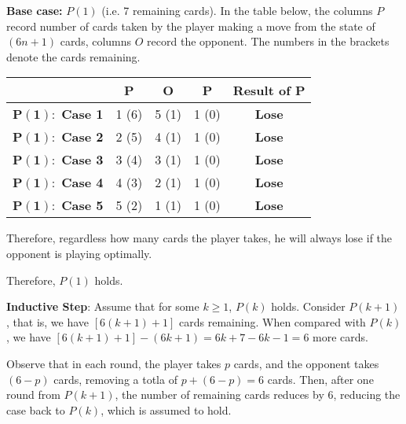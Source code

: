 \documentclass[answers]{exam}
\begin{document}
\begin{questions}
\begin{parts}
\begin{solution}
\begin{psol}
                \textbf{Base case:} $P(1)$ (i.e. 7 remaining cards).
                In the table below, the columns $P$ record number of cards taken by the player
                making a move from the state of $(6n+1)$ cards, columns $O$ record the opponent.
                The numbers in the brackets denote the cards remaining.
                \begin{center}
                    \begin{tabular}{|c||c|c|c||c|}
                        \hline
                                                        & \textbf{P}    & \textbf{O}    & \textbf{P}    & \textbf{Result of P} \\
                        \hline
                        $\bm{P(1):}$ \textbf{Case 1}    & 1 (6)         & 5 (1)         & 1 (0)         & \textbf{Lose} \\
                        $\bm{P(1):}$ \textbf{Case 2}    & 2 (5)         & 4 (1)         & 1 (0)         & \textbf{Lose} \\
                        $\bm{P(1):}$ \textbf{Case 3}    & 3 (4)         & 3 (1)         & 1 (0)         & \textbf{Lose} \\
                        $\bm{P(1):}$ \textbf{Case 4}    & 4 (3)         & 2 (1)         & 1 (0)         & \textbf{Lose} \\
                        $\bm{P(1):}$ \textbf{Case 5}    & 5 (2)         & 1 (1)         & 1 (0)         & \textbf{Lose} \\
                        \hline
                    \end{tabular}
                \end{center}
                Therefore, regardless how many cards the player takes, he will always lose if the
                opponent is playing optimally.

                Therefore, $P(1)$ holds.

                \textbf{Inductive Step}: Assume that for some $k\geq1$, $P(k)$ holds. Consider
                $P(k+1)$, that is, we have $[6(k+1)+1]$ cards remaining. When compared with
                $P(k)$, we have $[6(k+1)+1]-(6k+1)=6k+7-6k-1=6$ more cards.

                Observe that in each round, the player takes $p$ cards, and the opponent takes
                $(6-p)$ cards, removing a totla of $p+(6-p)=6$ cards. Then, after one round from
                $P(k+1)$, the number of remaining cards reduces by 6, reducing the case back to
                $P(k)$, which is assumed to hold.


\end{psol}
\end{solution}
\end{parts}
\end{questions}
\end{document}
